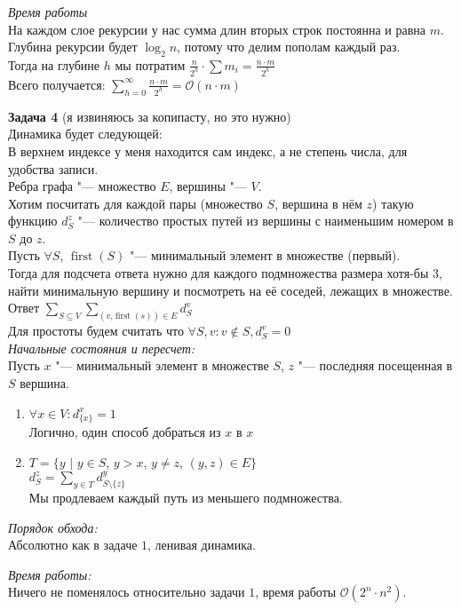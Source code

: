 \documentclass[14pt,a4paper,report]{ncc}
\begin{document}
\textit{Время работы}\\
На каждом слое рекурсии у нас сумма длин вторых строк постоянна и равна $m$.\\
Глубина рекурсии будет $\log_2{n}$, потому что делим пополам каждый раз.\\
Тогда на глубине $h$ мы потратим $\frac{n}{2^h} \cdot \sum{m_i} = \frac{n \cdot m}{2^h}$\\
Всего получается: $\sum_{h=0}^{\infty}\frac{n \cdot m}{2^h} = \mathcal{O}(n \cdot m)$

\textbf{Задача 4} (я извиняюсь за копипасту, но это нужно)\\

Динамика будет следующей:\\
В верхнем индексе у меня находится сам индекс, а не степень числа, для удобства записи.\\
Ребра графа "--- множество $E$, вершины "--- $V$.\\
Хотим посчитать для каждой пары (множество $S$, вершина в нём $z$) такую функцию $d_S^z$ "--- количество простых путей из вершины с наименьшим номером в $S$ до $z$.\\

Пусть $\forall S$, $\operatorname{first}(S)$ "--- минимальный элемент в множестве (первый).\\
Тогда для подсчета ответа нужно для каждого подмножества размера хотя-бы $3$, найти минимальную вершину и посмотреть на её соседей, лежащих в множестве.\\
Ответ $\sum_{S \subseteq V}{\sum_{(v \text{,} \operatorname{first}(s)) \in E}{d_{S}^v}}$\\
Для простоты будем считать что $\forall S, v: v \notin S, d_{S}^{v}=0$\\

\textit{Начальные состояния и пересчет:}\\
Пусть $x$ "--- минимальный элемент в множестве $S$, $z$ "--- последняя посещенная в $S$ вершина.\\
\begin{enumerate}
    \item {
        $\forall x \in V: d_{\{x\}}^{x} = 1$\\
        Логично, один способ добраться из $x$ в $x$
    }
    \item {
        $T = \{y \text{ | } y \in S$, $y > x$, $ y \neq z$, $(y, z) \in E\}$\\
        $d_{S}^{z} = \sum_{y \in T}{d_{S \setminus \{z\}}^{y}}$\\
        Мы продлеваем каждый путь из меньшего подмножества.
    }
\end{enumerate}

\textit{Порядок обхода:}\\
Абсолютно как в задаче $1$, ленивая динамика.

\textit{Время работы:}\\
Ничего не поменялось относительно задачи $1$, время работы $\mathcal{O}(2^n \cdot n^2)$.
\end{document}
